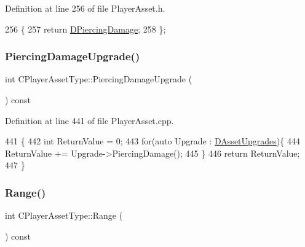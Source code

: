 Definition at line 256 of file Player\+Asset.\+h.


\begin{DoxyCode}
256                                   \{
257             \textcolor{keywordflow}{return} \hyperlink{classCPlayerAssetType_af7303175365306fb69e5ff9170b72234}{DPiercingDamage};  
258         \};
\end{DoxyCode}
\hypertarget{classCPlayerAssetType_a6194b4de23ad6a2e2966a868d0fe8d32}{}\label{classCPlayerAssetType_a6194b4de23ad6a2e2966a868d0fe8d32} 
\subsubsection{\texorpdfstring{Piercing\+Damage\+Upgrade()}{PiercingDamageUpgrade()}}
{\footnotesize\ttfamily int C\+Player\+Asset\+Type\+::\+Piercing\+Damage\+Upgrade (\begin{DoxyParamCaption}{ }\end{DoxyParamCaption}) const}



Definition at line 441 of file Player\+Asset.\+cpp.


\begin{DoxyCode}
441                                                  \{
442     \textcolor{keywordtype}{int} ReturnValue = 0;
443     \textcolor{keywordflow}{for}(\textcolor{keyword}{auto} Upgrade : \hyperlink{classCPlayerAssetType_aeb8d5c3ea81ea56248d02a5e24d48001}{DAssetUpgrades})\{
444         ReturnValue += Upgrade->PiercingDamage();
445     \}
446     \textcolor{keywordflow}{return} ReturnValue;
447 \}
\end{DoxyCode}
\hypertarget{classCPlayerAssetType_aa0e5a5e791c506dc5ac76d46ac6e719a}{}\label{classCPlayerAssetType_aa0e5a5e791c506dc5ac76d46ac6e719a} 
\subsubsection{\texorpdfstring{Range()}{Range()}}
{\footnotesize\ttfamily int C\+Player\+Asset\+Type\+::\+Range (\begin{DoxyParamCaption}{ }\end{DoxyParamCaption}) const\hspace{0.3cm}{\ttfamily [inline]}}



